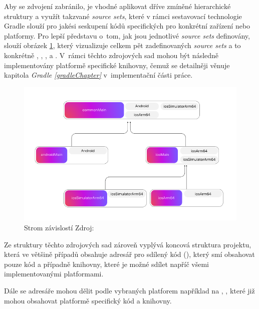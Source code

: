 Aby se zdvojení zabránilo, je vhodné aplikovat dříve zmíněné hierarchické struktury a využít takzvané \textit{source sets}, které v rámci sestavovací technologie Gradle slouží 
pro jakési seskupení kódů specifických pro konkrétní zařízení nebo platformy. Pro lepší představu o~tom, jak jsou jednotlivé
\textit{source sets} definovány, slouží obrázek \ref{fig:dependson-tree-diagram},
který vizualizuje celkem pět zadefinovaných \textit{source sets} a to konkrétně , , 
,  a . V~rámci těchto zdrojových sad mohou být následně implementovány
platformě specifické knihovny, čemuž se detailněji věnuje kapitola \textit{Gradle \ref{gradleChapter}} v~implementační části práce.


\begin{figure}[H]
  \centering
  \includegraphics[width=.9\textwidth]{dependson-tree-diagram.png}
  \caption{Strom závislostí Zdroj: \cite{imgStromZavislosti}}
  \label{fig:dependson-tree-diagram}
\end{figure}

Ze struktury těchto zdrojových sad zároveň vyplývá koncová struktura projektu, která ve většině případů obsahuje adresář pro sdílený kód (), 
který smí obsahovat pouze kód a případně knihovny, které je možné sdílet napříč všemi implementovanými platformami.

Dále se adresáře mohou dělit podle vybraných platforem například na , , které již mohou obsahovat platformě specifický kód a knihovny.

